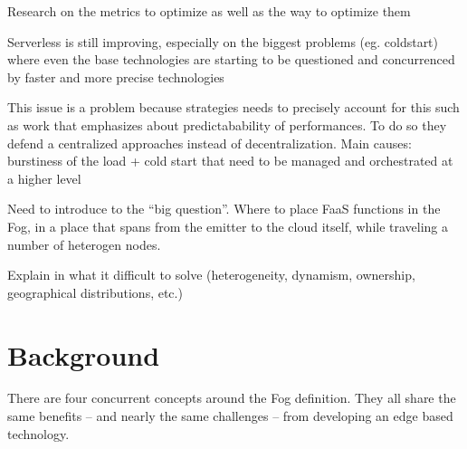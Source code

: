 \documentclass[11pt]{sdm}
\begin{document}
\begin{itemize}
{    \item Research on the metrics to optimize as well as the way to optimize them
    \item Serverless is still improving, especially on the biggest problems (eg. coldstart) where even the base technologies are starting to be questioned and concurrenced by faster and more precise technologies \citet{hykes_solomon_2019}
    \item This issue is a problem because strategies needs to precisely account for this such as  work that emphasizes about predictabability of performances. To do so they defend a centralized approaches instead of decentralization. Main causes: burstiness of the load + cold start that need to be managed and orchestrated at a higher level
    \item Need to introduce to the ``big question''. Where to place FaaS functions in the Fog, in a place that spans from the emitter to the cloud itself, while traveling a number of heterogen nodes.
    \item Explain in what it difficult to solve (heterogeneity, dynamism, ownership, geographical distributions, etc.)
    }

    
\end{itemize}

\section{Background}

There are four concurrent concepts around the Fog definition. They all share the same benefits -- and nearly the same challenges -- from developing an edge based technology.
\end{document}
